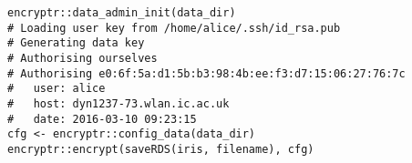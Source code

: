 \documentclass[class=minimal,border=0]{standalone}
\begin{document}
%
\begin{BVerbatim}[bgcolor=b-darkgrey]
encryptr::data_admin_init(data_dir)
# Loading user key from /home/alice/.ssh/id_rsa.pub
# Generating data key
# Authorising ourselves
# Authorising e0:6f:5a:d1:5b:b3:98:4b:ee:f3:d7:15:06:27:76:7c
#   user: alice
#   host: dyn1237-73.wlan.ic.ac.uk
#   date: 2016-03-10 09:23:15
cfg <- encryptr::config_data(data_dir)
encryptr::encrypt(saveRDS(iris, filename), cfg)
\end{BVerbatim}
\end{document}
